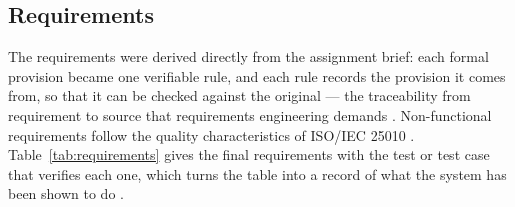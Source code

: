 \documentclass[a4paper,11pt]{article}
\begin{document}
\subsection{Requirements}\label{sec:requirements}

The requirements were derived directly from the assignment brief: each formal
provision became one verifiable rule, and each rule records the provision it
comes from, so that it can be checked against the original --- the traceability
from requirement to source that requirements engineering demands
\citep{Sommerville2020}. Non-functional requirements follow the quality
characteristics of ISO/IEC 25010 \citep{ISO25010}. Table~\ref{tab:requirements}
gives the final requirements with the test or test case that verifies each one,
which turns the table into a record of what the system has been shown to do
\citep{Khorikov2020}.
\end{document}
